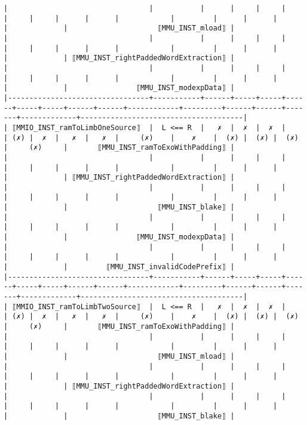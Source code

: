 \documentclass[varwidth=\maxdimen,margin=0.5cm,multi={verbatim}]{standalone}
\begin{document}
\begin{verbatim}
|                                 |           |      |     |     |      |     |     |      |      |            |         |      |      |       |             |                     ⟦MMU_INST_mload⟧ |
|                                 |           |      |     |     |      |     |     |      |      |            |         |      |      |       |             | ⟦MMU_INST_rightPaddedWordExtraction⟧ |
|                                 |           |      |     |     |      |     |     |      |      |            |         |      |      |       |             |                ⟦MMU_INST_modexpData⟧ |
|---------------------------------+-----------+------+-----+-----+------+-----+-----+------+------+------------+---------+------+------+-------+-------------+--------------------------------------|
| ⟦MMIO_INST_ramToLimbOneSource⟧  |  L <== R  |   ✗  |  ✗  |  ✗  |      | (✗) |  ✗  |   ✗  |   ✗  |     (✗)    |    ✗    |  (✗) |  (✗) |  (✗)  |     (✗)     |       ⟦MMU_INST_ramToExoWithPadding⟧ |
|                                 |           |      |     |     |      |     |     |      |      |            |         |      |      |       |             | ⟦MMU_INST_rightPaddedWordExtraction⟧ |
|                                 |           |      |     |     |      |     |     |      |      |            |         |      |      |       |             |                     ⟦MMU_INST_blake⟧ |
|                                 |           |      |     |     |      |     |     |      |      |            |         |      |      |       |             |                ⟦MMU_INST_modexpData⟧ |
|                                 |           |      |     |     |      |     |     |      |      |            |         |      |      |       |             |         ⟦MMU_INST_invalidCodePrefix⟧ |
|---------------------------------+-----------+------+-----+-----+------+-----+-----+------+------+------------+---------+------+------+-------+-------------+--------------------------------------|
| ⟦MMIO_INST_ramToLimbTwoSource⟧  |  L <== R  |   ✗  |  ✗  |  ✗  |      | (✗) |  ✗  |   ✗  |   ✗  |     (✗)    |    ✗    |  (✗) |  (✗) |  (✗)  |     (✗)     |       ⟦MMU_INST_ramToExoWithPadding⟧ |
|                                 |           |      |     |     |      |     |     |      |      |            |         |      |      |       |             |                     ⟦MMU_INST_mload⟧ |
|                                 |           |      |     |     |      |     |     |      |      |            |         |      |      |       |             | ⟦MMU_INST_rightPaddedWordExtraction⟧ |
|                                 |           |      |     |     |      |     |     |      |      |            |         |      |      |       |             |                     ⟦MMU_INST_blake⟧ |

\end{verbatim}
\end{document}

